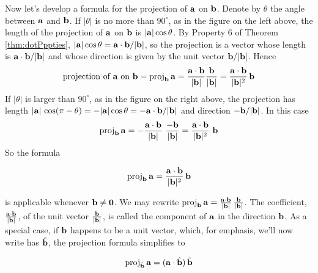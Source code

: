 Now let's develop a formula for the projection of $\mathbf{a}$ on $\mathbf{b}$.
Denote by $\theta$ the angle between $\mathbf{a}$ and $\mathbf{b}$. If $|\theta|$ is no
more than $90^\circ$, as in the figure on the left above, 
the length of the projection of $\mathbf{a}$ on $\mathbf{b}$ is 
$|\mathbf{a}|\cos\theta$.
By Property 6 of Theorem \ref{thm:dotPppties},  
$|\mathbf{a}|\cos\theta=\mathbf{a}\cdot\mathbf{b}/|\mathbf{b}|$, so the
projection is a vector whose length is $\mathbf{a}\cdot\mathbf{b}/|\mathbf{b}|$ and
whose direction is given by the unit vector $\mathbf{b}/|\mathbf{b}|$. Hence
\begin{align*}
\text{projection of $\mathbf{a}$ on $\mathbf{b}$}={\rm proj}_{\mathbf{b}}\,\mathbf{a}
=\frac{\mathbf{a}\cdot\mathbf{b}}{|\mathbf{b}|}\frac{\mathbf{b}}{|\mathbf{b}|}
=\frac{\mathbf{a}\cdot\mathbf{b}}{|\mathbf{b}|^2}\,\mathbf{b}
\end{align*}
If $|\theta|$ is larger than $90^\circ$, as in the figure on the right above, the projection has length 
$|\mathbf{a}|\,\cos(\pi-\theta)=-|\mathbf{a}|\cos\theta=-\mathbf{a}\cdot\mathbf{b}/|\mathbf{b}|$
 and direction $-\mathbf{b}/|\mathbf{b}|$. In this case
\begin{align*}
{\rm proj}_{\mathbf{b}}\,\mathbf{a}
=-\frac{\mathbf{a}\cdot\mathbf{b}}{|\mathbf{b}|}\ \frac{-\mathbf{b}}{|\mathbf{b}|}
=\frac{\mathbf{a}\cdot\mathbf{b}}{|\mathbf{b}|^2}\ \mathbf{b}
\end{align*}
So the formula 
\begin{impeqn}\label{eqn proj}
\begin{equation*}
{\rm proj}_{\mathbf{b}}\,\mathbf{a}=\frac{\mathbf{a}\cdot\mathbf{b}}{|\mathbf{b}|^2}\,\mathbf{b}
\end{equation*} 
\end{impeqn}\noindent
is applicable whenever $\mathbf{b}\ne\mathbf{0} $.
We may rewrite ${\rm proj}_{\mathbf{b}}\,\mathbf{a}
        =\frac{\mathbf{a}\cdot\mathbf{b}}{|\mathbf{b}|}\,\frac{\mathbf{b}}{|\mathbf{b}|}$.
The coefficient, $\frac{\mathbf{a}\cdot\mathbf{b}}{|\mathbf{b}|}$, of the unit vector 
$\frac{\mathbf{b}}{|\mathbf{b}|}$, is called the component of $\mathbf{a}$
in the direction $\mathbf{b}$.
 As a special case, if $\mathbf{b}$ happens 
to be a unit vector, which, for emphasis, we'll now write has $\hat{\mathbf{b}}$, 
the projection formula simplifies to
\begin{impeqn}\label{eqn unit proj}
\begin{align*}
{\rm proj}_{\hat{\mathbf{b}}}\,\mathbf{a}
=  (\mathbf{a}\cdot\hat{\mathbf{b}})\,\hat{\mathbf{b}}
\end{align*}
\end{impeqn}

